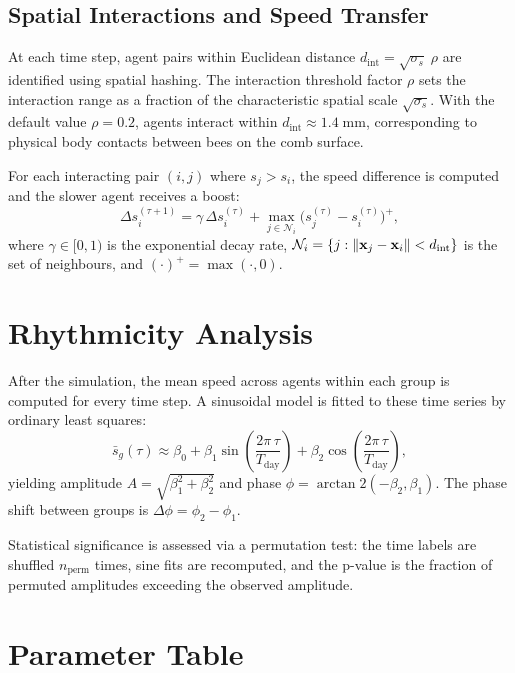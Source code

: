 \subsection{Spatial Interactions and Speed Transfer}

At each time step, agent pairs within Euclidean distance
$d_{\mathrm{int}} = \sqrt{\sigma_s}\;\rho$ are identified using spatial
hashing.  The interaction threshold factor $\rho$ sets the interaction range
as a fraction of the characteristic spatial scale $\sqrt{\sigma_s}$.  With the
default value $\rho = 0.2$, agents interact within
$d_{\mathrm{int}} \approx 1.4\;\mathrm{mm}$, corresponding to physical body
contacts between bees on the comb surface.

For each interacting pair $(i, j)$ where $s_j > s_i$, the speed difference is
computed and the slower agent receives a boost:
%
\begin{equation}
  \Delta s_i^{(\tau+1)} = \gamma \, \Delta s_i^{(\tau)}
    + \max_{j \in \mathcal{N}_i}\!\bigl(s_j^{(\tau)} - s_i^{(\tau)}\bigr)^{+},
\end{equation}
%
where $\gamma \in [0, 1)$ is the exponential decay rate,
$\mathcal{N}_i = \{j : \left\lVert \mathbf{x}_j - \mathbf{x}_i \right\rVert < d_{\mathrm{int}}\}$ is
the set of neighbours, and $(\cdot)^{+} = \max(\cdot, 0)$.

\section{Rhythmicity Analysis}

After the simulation, the mean speed across agents within each group is
computed for every time step.  A sinusoidal model is fitted to these time
series by ordinary least squares:
%
\begin{equation}
  \bar{s}_g(\tau) \approx \beta_0 + \beta_1 \sin\!\left(\frac{2\pi\,\tau}{T_{\mathrm{day}}}\right)
                                   + \beta_2 \cos\!\left(\frac{2\pi\,\tau}{T_{\mathrm{day}}}\right),
\end{equation}
%
yielding amplitude $A = \sqrt{\beta_1^2 + \beta_2^2}$ and phase
$\phi = \arctan2(-\beta_2, \beta_1)$.  The phase shift between groups is
$\Delta\phi = \phi_2 - \phi_1$.

Statistical significance is assessed via a permutation test: the time labels
are shuffled $n_{\mathrm{perm}}$ times, sine fits are recomputed, and the
p-value is the fraction of permuted amplitudes exceeding the observed
amplitude.

\section{Parameter Table}

